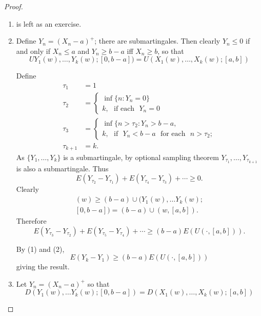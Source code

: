 \begin{proof}
\begin{enumerate}
\renewcommand{\theenumi}{\roman{enumi}}
\renewcommand{\labelenumi}{(\theenumi)}
\item is left as an exercise.

\item Define $Y_{n}=(X_{n}-a)^{+}$; there are submartingales. Then
  clearly $Y_{n}\leq 0$ if and only if $X_{n}\leq a$ and $Y_{n}\geq
  b-a$ iff $X_{n}\geq b$, so that
$$
UY_{1}(w),\ldots,Y_{k}(w);[0,b-a])=U(X_{1}(w),\ldots,X_{k}(w);[a,b])
$$\pageoriginale

Define
\begin{align*}
\tau_{1} &= 1\\[3pt]
\tau_{2} &= 
\begin{cases}
\inf \{n:Y_{n}=0\}\\
k,\text{~ if each~ } Y_{n}=0
\end{cases}\\[5pt]
\tau_{3} &=
\begin{cases}
\inf \{n>\tau_{2}:Y_{n}>b-a,\\
k,\text{~ if~ } Y_{n}<b-a\text{~ for each~ } n>\tau_{2};
\end{cases}\\[5pt]
\tau_{k+1} &= k.
\end{align*}
As $\{Y_{1},\ldots,Y_{k}\}$ is a submartingale, by optional sampling
theorem $Y_{\tau_{1}},\ldots,Y_{\tau_{k+1}}$ is also a
submartingale. Thus
\begin{equation*}
E(Y_{\tau_{2}}-Y_{\tau_{1}})+E(Y_{\tau_{4}}-Y_{\tau_{3}})+\cdots\geq 0.\tag{1}
\end{equation*}
Clearly
\begin{gather*}
[(Y_{\tau_{3}}-Y_{\tau_{2}})+(Y_{\tau_{5}}-Y_{\tau_{4}})+\cdots](w)\geq
(b-a)\cup (Y_{1}(w),\ldots Y_{k}(w);\\
[0,b-a])=(b-a)\cup (w,[a,b]).
\end{gather*}
Therefore
\begin{equation*}
E(Y_{\tau_{3}}-Y_{\tau_{2}})+E(Y_{\tau_{5}}-Y_{\tau_{4}})+\cdots\geq
(b-a)E(U(\cdot,[a,b])).\tag{2} 
\end{equation*}


By (1) and (2),
$$
E(Y_{k}-Y_{1})\geq (b-a)E(U(\cdot,[a,b]))
$$
giving the result.

\item Let $Y_{n}=(X_{n}-a)^{+}$ so that
$$
D(Y_{1}(w),\ldots Y_{k}(w);[0,b-a])=D(X_{1}(w),\ldots,X_{k}(w);[a,b])
$$


\end{enumerate}
\end{proof}
